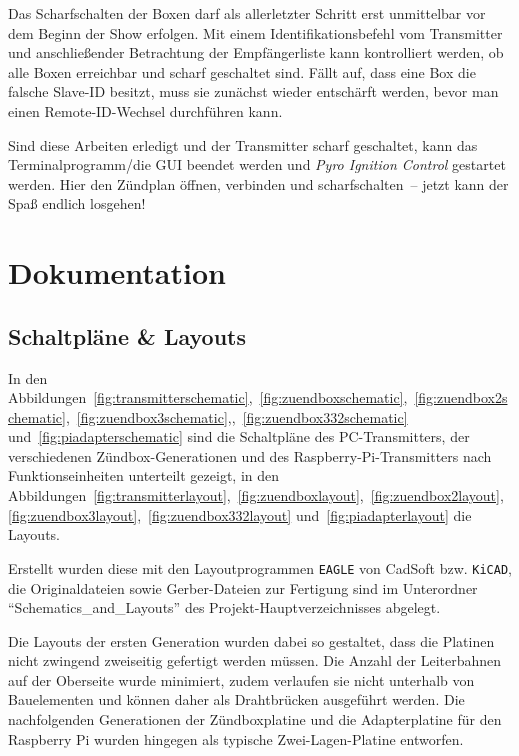 \documentclass[paper=a4, parskip, numbers=noenddot, toc=listof, headsepline]{scrbook}
\newcommand{\pic}{\emph{Pyro Ignition Control}}
\begin{document}
			Das Scharfschalten der Boxen darf als allerletzter Schritt erst unmittelbar vor dem Beginn der Show erfolgen. Mit einem Identifikationsbefehl vom Transmitter und anschließender Betrachtung der Empfängerliste kann kontrolliert werden, ob alle Boxen erreichbar und scharf geschaltet sind. Fällt auf, dass eine Box die falsche Slave-ID besitzt, muss sie zunächst wieder entschärft werden, bevor man einen Remote-ID-Wechsel durchführen kann.

			Sind diese Arbeiten erledigt und der Transmitter scharf geschaltet, kann das Terminalprogramm/die GUI beendet werden und {\pic} gestartet werden. Hier den Zündplan öffnen, verbinden und scharfschalten~-- jetzt kann der Spaß endlich losgehen!

\part{Dokumentation}
	\label{part:dokumentation}

	\chapter{Schaltpläne \& Layouts}

		In den Abbildungen~\ref{fig:transmitterschematic},~\ref{fig:zuendboxschematic},~\ref{fig:zuendbox2schematic},~\ref{fig:zuendbox3schematic},,~\ref{fig:zuendbox332schematic} und~\ref{fig:piadapterschematic} sind die Schaltpläne des PC-Transmitters, der verschiedenen Zündbox-Generationen und des Raspberry-Pi-Transmitters nach Funk\-tions\-ein\-heiten unterteilt gezeigt, in den Abbildungen~\ref{fig:transmitterlayout},~\ref{fig:zuendboxlayout},~\ref{fig:zuendbox2layout},~\ref{fig:zuendbox3layout},~\ref{fig:zuendbox332layout} und~\ref{fig:piadapterlayout} die Layouts.

		Erstellt wurden diese mit den Layoutprogrammen \texttt{EAGLE} von CadSoft bzw. \texttt{KiCAD}, die Originaldateien sowie Gerber-Dateien zur Fertigung sind im Unterordner \enquote{Schematics\_and\_Layouts} des Projekt-Hauptverzeichnisses abgelegt.

		Die Layouts der ersten Generation wurden dabei so gestaltet, dass die Platinen nicht zwingend zweiseitig gefertigt werden müssen. Die Anzahl der Leiterbahnen auf der Oberseite wurde minimiert, zudem verlaufen sie nicht unterhalb von Bauelementen und können daher als Drahtbrücken ausgeführt werden. Die nachfolgenden Generationen der Zündboxplatine und die Adapterplatine für den Raspberry Pi wurden hingegen als typische Zwei-Lagen-Platine entworfen.
\end{document}
